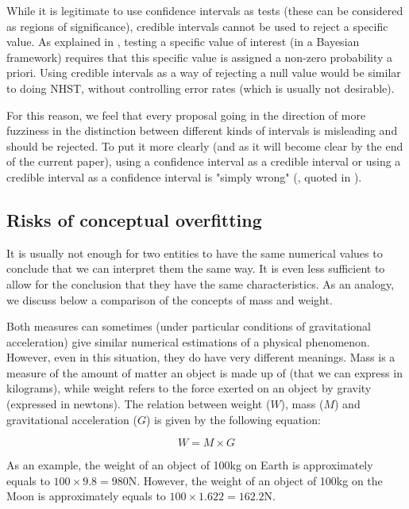 \documentclass[a4paper,man,natbib,floatsintext,donotrepeattitle]{apa6}
\begin{document}
While it is legitimate to use confidence intervals as tests (these can be considered as regions of significance), credible intervals cannot be used to reject a specific value. As explained in \cite{morey_fallacy_2015}, testing a specific value of interest (in a Bayesian framework) requires that this specific value is assigned a non-zero probability a priori. Using credible intervals as a way of rejecting a null value would be similar to doing NHST, without controlling error rates (which is usually not desirable).

For this reason, we feel that every proposal going in the direction of more fuzziness in the distinction between different kinds of intervals is misleading and should be rejected. To put it more clearly (and as it will become clear by the end of the current paper), using a confidence interval as a credible interval or using a credible interval as a confidence interval is "simply wrong" (\citealp{berger_bayes_2006}, quoted in \citealp{morey_fallacy_2015}).

\subsection{Risks of conceptual overfitting}

It is usually not enough for two entities to have the same numerical values to conclude that we can interpret them the same way. It is even less sufficient to allow for the conclusion that they have the same characteristics. As an analogy, we discuss below a comparison of the concepts of mass and weight.

Both measures can sometimes (under particular conditions of gravitational acceleration) give similar numerical estimations of a physical phenomenon. However, even in this situation, they do have very different meanings. Mass is a measure of the amount of matter an object is made up of (that we can express in kilograms), while weight refers to the force exerted on an object by gravity (expressed in newtons). The relation between weight ($W$), mass ($M$) and gravitational acceleration ($G$) is given by the following equation:

$$ W = M \times G $$

As an example, the weight of an object of 100kg on Earth is approximately equals to $100 \times 9.8 = 980 \text{N}$. However, the weight of an object of 100kg on the Moon is approximately equals to $100 \times 1.622 = 162.2\text{N}$.
\end{document}

